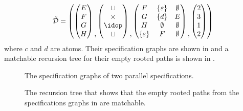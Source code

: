 \[
    \spec{D} = \left(
        \begin{pmatrix}
            E\\F\\G\\H
        \end{pmatrix}
        \begin{matrix}\\\\\\,\end{matrix}
        \begin{pmatrix}
            \sqcup\\\times\\\idop\\\sqcup
        \end{pmatrix}
        \begin{matrix}\\\\\\,\end{matrix}
        \begin{pmatrix}
            F & \set{\varepsilon} & \emptyset\\
            G & \set{d} & E\\
            H & \emptyset & \emptyset\\
            \set{\varepsilon} & F & \emptyset
        \end{pmatrix}
        \begin{matrix}\\\\\\,\end{matrix}
        \begin{pmatrix}
            2\\3\\1\\2
        \end{pmatrix}
    \right)
\]
where $c$ and $d$ are atoms. Their specification graphs are shown in  and a matchable recursion tree for their empty rooted paths is shown in .
\begin{figure}[htbp]
    \centering
    
    \caption{The specification graphs of two parallel specifications.}
    \label{fig:para_spec}
\end{figure}
\begin{figure}[ht!]
    \centering
    
    \caption{The recursion tree that shows that the empty rooted paths from the specifications graphs in  are matchable.}
    \label{fig:para_spec_rec}
\end{figure}

